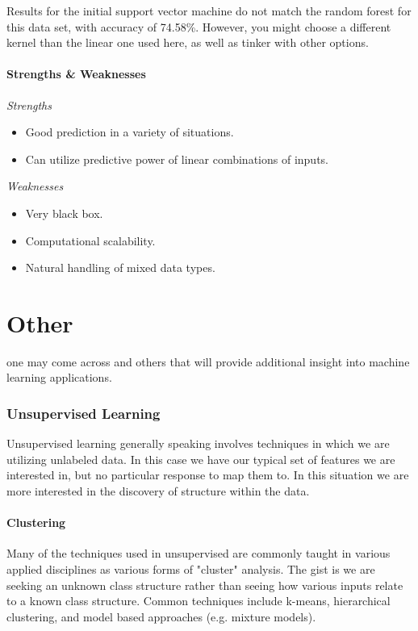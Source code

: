 \documentclass[english,nohyper,titlepage]{tufte-handout}\usepackage{knitr}
\begin{document}
Results for the initial support vector machine do not match the random forest for this data set, with accuracy of 74.58\%.  However, you might choose a different kernel than the linear one used here, as well as tinker with other options.


\subsection{Strengths \& Weaknesses}

\emph{Strengths}
\begin{itemize}
  \item Good prediction in a variety of situations.
  \item Can utilize predictive power of linear combinations of inputs.
\end{itemize}


\noindent\emph{Weaknesses}
\begin{itemize}
  \item Very black box.
  \item Computational scalability.
  \item Natural handling of mixed data types.
\end{itemize}









\part{Other}
 one may come across and others that will provide additional insight into machine learning applications.

\section{Unsupervised Learning}
Unsupervised learning generally speaking involves techniques in which we are utilizing unlabeled data. In this case we have our typical set of features we are interested in, but no particular response to map them to.  In this situation we are more interested in the discovery of structure within the data.

\subsection{Clustering}
Many of the techniques used in unsupervised are commonly taught in various applied disciplines as various forms of "cluster" analysis.  The gist is we are seeking an unknown class structure rather than seeing how various inputs relate to a known class structure.  Common techniques include k-means, hierarchical clustering, and model based approaches (e.g. mixture models).
\end{document}
